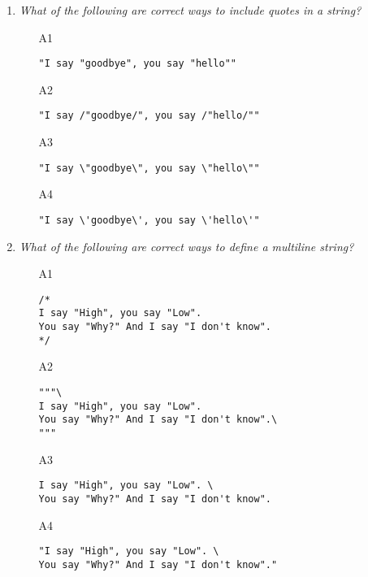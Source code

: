 \begin{enumerate}
\item {\em What of the following are correct ways to include quotes in a string?}\\

\begin{enumerate}
\item[A1] 
\begin{verbatim}
"I say "goodbye", you say "hello""
\end{verbatim}
\item[A2] 
\begin{verbatim}
"I say /"goodbye/", you say /"hello/""
\end{verbatim}
\item[A3] 
\begin{verbatim}
"I say \"goodbye\", you say \"hello\""
\end{verbatim}
\item[A4] 
\begin{verbatim}
"I say \'goodbye\', you say \'hello\'"
\end{verbatim}
\end{enumerate}

\vspace{6mm}

\item {\em What of the following are correct ways to define a multiline string?}\\

\begin{enumerate}
\item[A1] 
\begin{verbatim}
/*
I say "High", you say "Low".
You say "Why?" And I say "I don't know".
*/
\end{verbatim}
\item[A2] 
\begin{verbatim}
"""\
I say "High", you say "Low".
You say "Why?" And I say "I don't know".\
"""
\end{verbatim}
\item[A3] 
\begin{verbatim}
I say "High", you say "Low". \
You say "Why?" And I say "I don't know".
\end{verbatim}
\item[A4] 
\begin{verbatim}
"I say "High", you say "Low". \
You say "Why?" And I say "I don't know"."
\end{verbatim}
\end{enumerate}


\end{enumerate}
